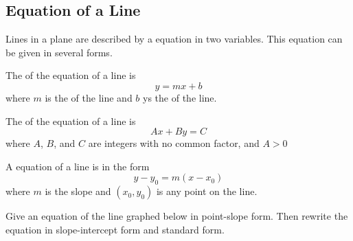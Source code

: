 \subsection{Equation of a Line} 
Lines in a plane are described by a \makeblank[1in] equation in two variables. This equation can be given in several forms.
\begin{definition}
The  of the equation of a line is
\[
y=mx+b
\]
where $m$ is the  of the line and $b$ ys the  of the line.
\end{definition}
\begin{definition}
The  of the equation of a line is
\[
Ax+By=C
\]
where $A$, $B$, and $C$ are integers with no common factor, and $A>0$
\end{definition}
\begin{definition}
A  equation of a line is in the form
\[
y-y_0=m(x-x_0)
\]
where $m$ is the slope and $\left(x_0,y_0\right)$ is any point on the line.
\end{definition}
\begin{Example}
Give an equation of the line graphed below in point-slope form. Then rewrite the equation in slope-intercept form and standard form.
\begin{filler}
%
\end{filler}
\end{Example}